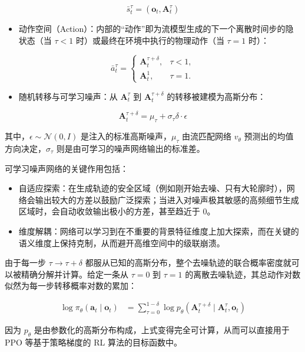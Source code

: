 \[
\bar{s}_t^\tau=(\mathbf{o}_t,\mathbf{A}_t^\tau)
\]

\begin{itemize}
\tightlist
\item
  动作空间（Action）：内部的``动作''即为流模型生成的下一个离散时间步的隐状态（当 \(\tau<1\) 时）或最终在环境中执行的物理动作（当 \(\tau=1\) 时）：
\end{itemize}

\[
\bar{a}_t^\tau=
\begin{cases}
\mathbf{A}_t^{\tau+\delta}, & \tau<1,\\
\mathbf{A}_t^1, & \tau=1.
\end{cases}
\]

\begin{itemize}
\tightlist
\item
  随机转移与可学习噪声：从 \(\mathbf{A}_t^\tau\) 到 \(\mathbf{A}_t^{\tau+\delta}\) 的转移被建模为高斯分布：
\end{itemize}

\[
\mathbf{A}_t^{\tau+\delta}=\mu_\tau+\sigma_\tau\delta\cdot\epsilon
\]

其中，\(\epsilon\sim\mathcal{N}(0,I)\) 是注入的标准高斯噪声，\(\mu_\tau\) 由流匹配网络 \(v_\theta\) 预测出的均值方向决定，\(\sigma_\tau\) 则是由可学习的噪声网络输出的标准差。

可学习噪声网络的关键作用包括：

\begin{itemize}
\tightlist
\item
  自适应探索：在生成轨迹的安全区域（例如刚开始去噪、只有大轮廓时），网络会输出较大的方差以鼓励广泛探索；当进入对噪声极其敏感的高频细节生成区域时，会自动收敛输出极小的方差，甚至趋近于 0。
\item
  维度解耦：网络可以学习到在不重要的背景特征维度上加大探索，而在关键的语义维度上保持克制，从而避开高维空间中的级联崩溃。
\end{itemize}

由于每一步 \(\tau\rightarrow\tau+\delta\) 都服从已知的高斯分布，整个去噪轨迹的联合概率密度就可以被精确分解并计算。给定一条从 \(\tau=0\) 到 \(\tau=1\) 的离散去噪轨迹，其总动作对数似然为每一步转移概率对数的累加：

\[
\begin{aligned}
\log \pi_\theta(\mathbf{a}_t \mid \mathbf{o}_t)
&=
\sum_{\tau=0}^{1-\delta}
\log p_\theta(\mathbf{A}_t^{\tau+\delta}\mid \mathbf{A}_t^\tau,\mathbf{o}_t)
\end{aligned}
\]

因为 \(p_\theta\) 是由参数化的高斯分布构成，上式变得完全可计算，从而可以直接用于 PPO 等基于策略梯度的 RL 算法的目标函数中。

